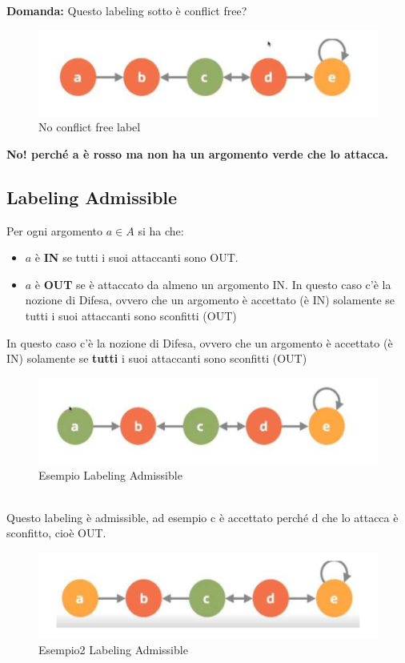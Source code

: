     \textbf{Domanda: } Questo labeling sotto è conflict free?
    \begin{figure}[htp]
        \centering
        \includegraphics[width=12cm, keepaspectratio]{img/Cap7/CF3.png}
        \caption{No conflict free label}
    \end{figure}
    \begin{center}
        \textbf{No! perché a è rosso ma non ha un argomento verde che lo attacca.}
    \end{center}
    \newpage
    \subsection{Labeling Admissible}
    Per ogni argomento $a \in A$ si ha che:
    \begin{itemize}
        \item $a$ è \textbf{IN} se tutti i suoi attaccanti sono OUT.
        \item $a$ è \textbf{OUT} se è attaccato da almeno un argomento IN. In
              questo caso c'è la nozione di Difesa, ovvero che un argomento è
              accettato (è IN) solamente se tutti i suoi attaccanti sono sconfitti
              (OUT)
    \end{itemize}
    In questo caso c'è la nozione di Difesa, ovvero che un argomento è accettato
    (è IN) solamente se \textbf{tutti} i suoi attaccanti sono sconfitti (OUT)
    \begin{figure}[htp]
        \centering
        \includegraphics[width=12cm, keepaspectratio]{img/Cap7/LA.png}
        \caption{Esempio Labeling Admissible}
    \end{figure}
    \\Questo labeling è admissible, ad esempio c è accettato perché d che lo
    attacca è sconfitto, cioè OUT.
    \begin{figure}[htp]
        \centering
        \includegraphics[width=12cm, keepaspectratio]{img/Cap7/LA2.png}
        \caption{Esempio2 Labeling Admissible}
    \end{figure}
